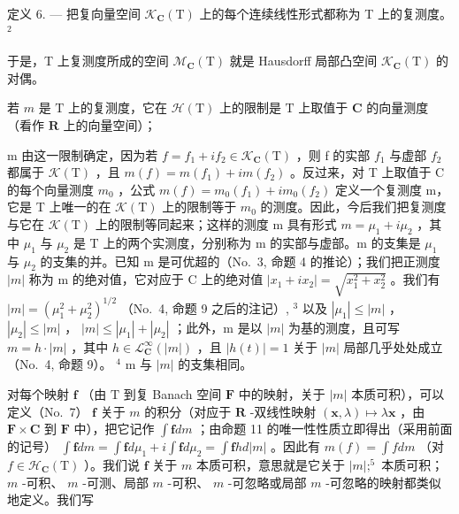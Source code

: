 定义 6. --- 把复向量空间 \(\mathcal{K}_{\mathbf{C}}(\mathrm{T})\) 上的每个连续线性形式都称为 T 上的复测度。 \(^{2}\)

于是，T 上复测度所成的空间 \(\mathcal{M}_{\mathbf{C}}(\mathrm{T})\) 就是 Hausdorff 局部凸空间 \(\mathcal{K}_{\mathbf{C}}(\mathrm{T})\) 的对偶。

若 \(m\) 是 \(\mathrm{T}\) 上的复测度，它在 \(\mathcal{H}(\mathrm{T})\) 上的限制是 \(\mathrm{T}\) 上取值于 \(\mathbf{C}\) 的向量测度（看作 \(\mathbf{R}\) 上的向量空间）；

m 由这一限制确定，因为若 \(f = f_{1} + if_{2} \in \mathcal{K}_{\mathbf{C}}(\mathrm{T})\) ，则 f 的实部 \(f_{1}\) 与虚部 \(f_{2}\) 都属于 \(\mathcal{K}(\mathrm{T})\) ，且 \(m(f) = m(f_{1}) + im(f_{2})\) 。反过来，对 T 上取值于 C 的每个向量测度 \(m_{0}\) ，公式 \(m(f) = m_{0}(f_{1}) + im_{0}(f_{2})\) 定义一个复测度 m，它是 T 上唯一的在 \(\mathcal{K}(\mathrm{T})\) 上的限制等于 \(m_{0}\) 的测度。因此，今后我们把复测度与它在 \(\mathcal{K}(\mathrm{T})\) 上的限制等同起来；这样的测度 m 具有形式 \(m = \mu_{1} + i\mu_{2}\) ，其中 \(\mu_{1}\) 与 \(\mu_{2}\) 是 T 上的两个实测度，分别称为 m 的实部与虚部。m 的支集是 \(\mu_{1}\) 与 \(\mu_{2}\) 的支集的并。已知 m 是可优超的（No.~3, 命题 4 的推论）；我们把正测度 \(|m|\) 称为 m 的绝对值，它对应于 C 上的绝对值 \(|x_{1} + ix_{2}| = \sqrt{x_{1}^{2} + x_{2}^{2}}\) 。我们有 \(|m| = (\mu_{1}^{2} + \mu_{2}^{2})^{1/2}\) （No.~4, 命题 9 之后的注记）, \(^{3}\) 以及 \(|\mu_{1}| \leqslant |m|\) ， \(|\mu_{2}| \leqslant |m|\) ， \(|m| \leqslant |\mu_{1}| + |\mu_{2}|\) ；此外，m 是以 \(|m|\) 为基的测度，且可写 \(m = h \cdot |m|\) ，其中 \(h \in \mathcal{L}_{\mathbf{C}}^{\infty}(|m|)\) ，且 \(|h(t)| = 1\) 关于 \(|m|\) 局部几乎处处成立（No.~4, 命题 9）。 \(^{4}\) m 与 \(|m|\) 的支集相同。

对每个映射 \(\mathbf{f}\) （由 \(\mathrm{T}\) 到复 Banach 空间 \(\mathbf{F}\) 中的映射，关于 \(|m|\) 本质可积），可以定义（No.~7） \(\mathbf{f}\) 关于 \(m\) 的积分（对应于 \(\mathbf{R}\) -双线性映射 \((\mathbf{x},\lambda)\mapsto\lambda\mathbf{x}\) ，由 \(\mathbf{F}\times\mathbf{C}\) 到 \(\mathbf{F}\) 中），把它记作 \(\int\mathbf{f}dm\) ；由命题 11 的唯一性性质立即得出（采用前面的记号） \(\int\mathbf{f}dm=\int\mathbf{f}d\mu_{1}+i\int\mathbf{f}d\mu_{2}=\int\mathbf{f}hd|m|\) 。因此有 \(m(f)=\int fdm\) （对 \(f\in\mathcal{H}_{\mathbf{C}}(\mathrm{T})\) ）。我们说 \(\mathbf{f}\) 关于 \(m\) 本质可积，意思就是它关于 \(|m|;^{5}\) 本质可积； \(m\) -可积、 \(m\) -可测、局部 \(m\) -可积、 \(m\) -可忽略或局部 \(m\) -可忽略的映射都类似地定义。我们写

